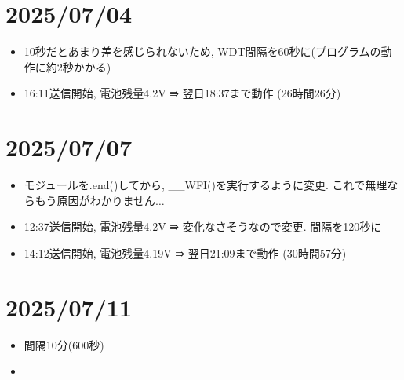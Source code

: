 \section{2025/07/04}
\begin{itemize}
    \item 10秒だとあまり差を感じられないため, WDT間隔を60秒に(プログラムの動作に約2秒かかる)
    \item 16:11送信開始, 電池残量4.2V ⇛ 翌日18:37まで動作 (26時間26分)
\end{itemize}

\section{2025/07/07}
\begin{itemize}
    \item モジュールを.end()してから, __WFI()を実行するように変更. これで無理ならもう原因がわかりません$\dots$
    \item 12:37送信開始, 電池残量4.2V ⇛ 変化なさそうなので変更. 間隔を120秒に
    \item 14:12送信開始, 電池残量4.19V ⇛ 翌日21:09まで動作 (30時間57分)
\end{itemize}

\section{2025/07/11}
\begin{itemize}
    \item 間隔10分(600秒)
    \item
\end{itemize}



